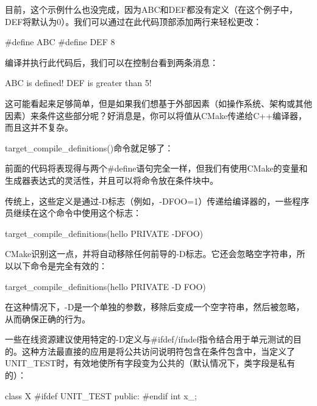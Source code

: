 目前，这个示例什么也没完成，因为ABC和DEF都没有定义（在这个例子中，DEF将默认为0）。我们可以通过在此代码顶部添加两行来轻松更改：

\begin{cpp}
#define ABC
#define DEF 8
\end{cpp}

编译并执行此代码后，我们可以在控制台看到两条消息：

\begin{shell}
ABC is defined!
DEF is greater than 5!
\end{shell}

这可能看起来足够简单，但是如果我们想基于外部因素（如操作系统、架构或其他因素）来条件这些部分呢？好消息是，你可以将值从CMake传递给C++编译器，而且这并不复杂。

target\_compile\_definitions()命令就足够了：



前面的代码将表现得与两个\#define语句完全一样，但我们有使用CMake的变量和生成器表达式的灵活性，并且可以将命令放在条件块中。

传统上，这些定义是通过-D标志（例如，-DFOO=1）传递给编译器的，一些程序员继续在这个命令中使用这个标志：

\begin{cmake}
target_compile_definitions(hello PRIVATE -DFOO)
\end{cmake}

CMake识别这一点，并将自动移除任何前导的-D标志。它还会忽略空字符串，所以以下命令是完全有效的：

\begin{cmake}
target_compile_definitions(hello PRIVATE -D FOO)
\end{cmake}

在这种情况下，-D是一个单独的参数，移除后变成一个空字符串，然后被忽略，从而确保正确的行为。


一些在线资源建议使用特定的-D定义与\#ifdef/ifndef指令结合用于单元测试的目的。这种方法最直接的应用是将公共访问说明符包含在条件包含中，当定义了UNIT\_TEST时，有效地使所有字段变为公共的（默认情况下，类字段是私有的）：

\begin{cpp}
class X {
#ifdef UNIT_TEST
    public:
#endif
    int x_;
}
\end{cpp}

